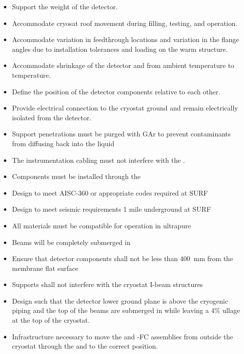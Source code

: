 \begin{itemize}
 \setlength\itemsep{1mm}
\setlength{\parsep}{1mm}
\setlength{\itemsep}{-5mm}
\item Support the weight of the detector.
\item Accommodate cryosat roof movement during filling, testing, and operation.
\item Accommodate variation in feedthrough locations and
  variation in the flange angles due to installation tolerances and
  loading on the warm structure.
\item Accommodate shrinkage of the detector and  from ambient
  temperature to  temperature.
\item Define the position of the detector components relative to each other. 
\item Provide electrical connection to the cryostat ground and remain electrically isolated from the detector.
\item Support penetrations must be purged with GAr to prevent contaminants from diffusing back into the liquid
\item The instrumentation cabling must not interfere with the .
\item Components must be installed through the 
\item Design to meet AISC-360 or appropriate codes required at SURF
\item Design to meet seismic requirements 1 mile underground at SURF
\item All materials must be compatible for operation in ultrapure 
\item Beams will be completely submerged in 
\item Ensure that detector components shall not be less than \SI{400}{mm} from the membrane flat surface
\item Supports shall not interfere with the cryostat I-beam structures
\item Design such that the detector lower ground plane is above the cryogenic piping and the top of the  beams are submerged in  while leaving a 4\% ullage at the top of the cryostat.
\item Infrastructure necessary to move the  and
  -FC assemblies from outside the cryostat through the
   and to the correct position.
\end{itemize}

